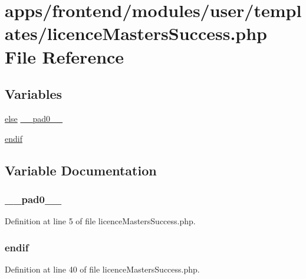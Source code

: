 \hypertarget{licence_masters_success_8php}{\section{apps/frontend/modules/user/templates/licence\-Masters\-Success.php File Reference}
\label{licence_masters_success_8php}
}
\subsection*{Variables}
\begin{DoxyCompactItemize}
\item 
\hyperlink{live_2modules_2team_2templates_2management_success_8php_a0544c3fe466e421738dae463968b70ba}{else} \hyperlink{licence_masters_success_8php_a8e01dcc96c43199448ee66f7c2ae8ea6}{\-\_\-\-\_\-pad0\-\_\-\-\_\-}
\item 
\hyperlink{licence_masters_success_8php_a82cd33ca97ff99f2fcc5e9c81d65251b}{endif}
\end{DoxyCompactItemize}


\subsection{Variable Documentation}
\hypertarget{licence_masters_success_8php_a8e01dcc96c43199448ee66f7c2ae8ea6}{
\subsubsection[{\-\_\-\-\_\-pad0\-\_\-\-\_\-}]{ \-\_\-\-\_\-pad0\-\_\-\-\_\-}}\label{licence_masters_success_8php_a8e01dcc96c43199448ee66f7c2ae8ea6}


Definition at line 5 of file licence\-Masters\-Success.\-php.

\hypertarget{licence_masters_success_8php_a82cd33ca97ff99f2fcc5e9c81d65251b}{
\subsubsection[{endif}]{\setlength{\rightskip}{0pt plus 5cm}endif}}\label{licence_masters_success_8php_a82cd33ca97ff99f2fcc5e9c81d65251b}


Definition at line 40 of file licence\-Masters\-Success.\-php.

